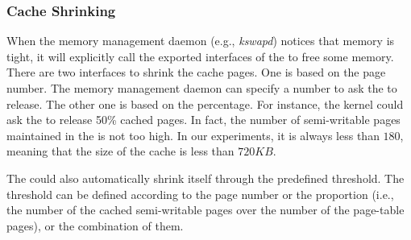 \subsubsection{Cache Shrinking}
When the memory management daemon (e.g., \emph{kswapd}) notices that memory is tight, it will explicitly call the exported interfaces of the \cache to free some memory.
There are two interfaces to shrink the cache pages. One is based on the page number. The memory management daemon can specify a number to ask the \cache to release.
The other one is based on the percentage. For instance, the kernel could ask the \cache to release 50\% cached pages.
In fact, the number of semi-writable pages maintained in the \cache is not too high. In our experiments, it is always less than $180$, meaning that the size of the cache is less than $720KB$.

The \cache could also automatically shrink itself through the predefined threshold.
The threshold can be defined according to the page number or the proportion (i.e., the number of the cached semi-writable pages over the number of the page-table pages), or the combination of them.






